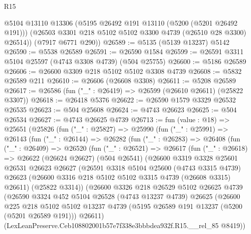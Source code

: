 \begin{lexlean}{R15}
\begin{coremodule}
{{{{{{{{{{{        @5104
        @13110
        @13306
        (@5195 @26492 @191 @13110 (@5200 (@5201 @26492 @191)))
        (@26503 @3301 @218 @5102 @5102 @3300 @4739 (@26510 @28 @3300) @26514))
      (@7917 @6771 @290))
@26589 := @5135 (@5139 @13237) @5142
@26590 := @5538 @26589
@26591 := @26590 @1584
@26599 := @26591 @3311 @5104 @25597 (@4743 @3308 @4739) (@504 @25755)
@26600 := @5186 @26589
@26606 := @26600 @3309 @218 @5102 @5102 @3308 @4739
@26608 := @5832 @26589 @211
@26610 := @26606 (@26608 @3308)
@26611 := @5208 @26589
@26617 := @26586 (fun ("_" : @26419) => @26599 (@26610 @26611) (@25822 @3307))
@26618 := @26418 @5376
@26622 := @26590 @1579 @3329 @26532 @26535
@26623 := @504 @25608
@26624 := @4743 @26623
@26625 := @504 @26534
@26627 := @4743 @26625 @4739
@26713 := fun (value : @18) =>
  @25651
    (@25826
      (fun ("_" : @25827) =>
      @25990
        (fun ("_" : @25991) =>
        @26143
          (fun ("_" : @26144) =>
          @26282
            (fun ("_" : @26283) =>
            @26408
              (fun ("_" : @26409) =>
              @26520
                (fun ("_" : @26521) =>
                @26617
                  (fun ("_" : @26618) =>
                  @26622
                    (@26624 @26627)
                    (@504 @26541)
                    (@26600
                      @3319
                      @3328
                      @25601
                      @26531
                      @26623
                      @26627
                      (@26591
                        @3318
                        @5104
                        @25600
                        (@4743 @3315 @4739)
                        @26623
                        (@26600 @3316 @218 @5102 @5102 @3315 @4739 (@26608 @3315) @26611)
                        (@25822 @3314))
                      (@26600
                        @3326
                        @218
                        @26529
                        @5102
                        @26625
                        @4739
                        (@26590
                          @3324
                          @452
                          @5104
                          @26528
                          (@4743 @13237 @4739)
                          @26625
                          (@26600
                            @225
                            @218
                            @5102
                            @5102
                            @13237
                            @4739
                            (@5195 @26589 @191 @13237 (@5200 (@5201 @26589 @191)))
                            @26611)
                          (LexLeanPreserve.Ceb108802001b57e7f338e3bbbdea932f.R15.__rel_85 @8419))
}}}}}}}}}}}
\end{coremodule}
\end{lexlean}
